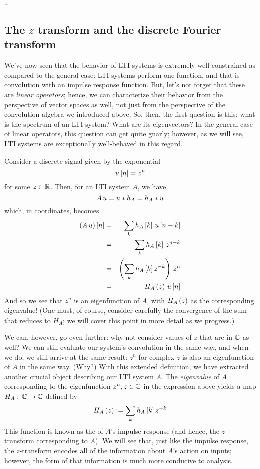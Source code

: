 \ldots

\subsection{The $z$ transform and the discrete Fourier transform}

We've now seen that the behavior of LTI systems is extremely well-constrained as compared to the general case: LTI systems perform one function, and that is convolution with an impulse response function. But, let's not forget that these are \emph{linear operators}; hence, we can characterize their behavior from the perspective of vector spaces as well, not just from the perspective of the convolution algebra we introduced above. So, then, the first question is this: what is the spectrum of an LTI system? What are its eigenvectors? In the general case of linear operators, this question can get quite gnarly; however, as we will see, LTI systems are exceptionally well-behaved in this regard.

Consider a discrete signal given by the exponential
\[ u\left[ n \right] = z^n \]
for some $z \in \mathbb{R}$. Then, for an LTI system $A$, we have
\[ A\,u = u \ast h_A = h_A \ast u \]
which, in coordinates, becomes
\begin{eqnarray*}
    \left(A\,u\right)\left[ n \right] & = & \sum_k h_A\left[ k \right] \, u\left[ n-k \right] \\
      & = & \sum_k h_A\left[ k \right] \, z^{n - k} \\
      & = & \left( \sum_k h_A\left[ k \right] z^{-k} \right) \, z^n \\
      & = & H_A\left( z \right) \, u\left[ n \right]
\end{eqnarray*}
And so we see that $z^n$ is an eigenfunction of $A$, with $H_A\left( z \right)$ as the corresponding eigenvalue! (One must, of course, consider carefully the convergence of the sum that reduces to $H_A$; we will cover this point in more detail as we progress.)

We can, however, go even further: why not consider values of $z$ that are in $\mathbb{C}$ as well? We can still evaluate our system's convolution in the same way, and when we do, we still arrive at the same result: $z^n$ for complex $z$ is also an eigenfunction of $A$ in the same way. (Why?) With this extended definition, we have extracted another crucial object describing our LTI system $A$. The \emph{eigenvalue} of $A$ corresponding to the eigenfunction $z^n, z \in \mathbb{C}$ in the expression above yields a map $H_A: \, \mathbb{C} \to \mathbb{C}$ defined by
\[ H_A\left( z \right) := \sum_k h_A\left[ k \right] z^{-k} \]
This function is known as the  of $A$'s impulse response (and hence, the $z$-transform corresponding to $A$). We will see that, just like the impulse response, the $z$-transform encodes all of the information about $A$'s action on inputs; however, the form of that information is much more conducive to analysis.

